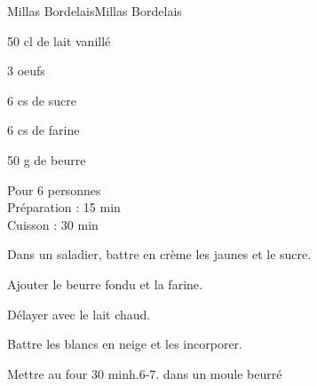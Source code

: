 \begin{recette}{Millas Bordelais}{Millas Bordelais}

\begin{ingredients}
50 cl de lait vanillé\par
3 oeufs\par
6 cs de sucre\par
6 cs de farine\par
50 g de beurre\par
\end{ingredients}

\begin{infos}
Pour 6 personnes\\
Préparation : 15 min\\
Cuisson : 30 min\\
\end{infos}

\begin{etapes}
\item Dans un saladier, battre en crème les jaunes et le sucre.
\item Ajouter le beurre fondu et la farine.
\item Délayer avec le lait chaud.
\item Battre les blancs en neige et les incorporer.
\item Mettre au four 30 minh.6-7. dans un moule beurré
\end{etapes}

\end{recette}